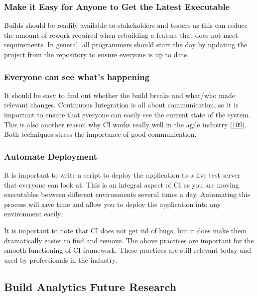 \documentclass[]{book}
\begin{document}
\subsubsection{Make it Easy for Anyone to Get the Latest
Executable}\label{make-it-easy-for-anyone-to-get-the-latest-executable}

Builds should be readily available to stakeholders and testers as this
can reduce the amount of rework required when rebuilding a feature that
does not meet requirements. In general, all programmers should start the
day by updating the project from the repository to ensure everyone is up
to date.

\subsubsection{Everyone can see what's
happening}\label{everyone-can-see-whats-happening}

It should be easy to find out whether the build breaks and what/who made
relevant changes. Continuous Integration is all about communication, so
it is important to ensure that everyone can easily see the current state
of the system. This is also another reason why CI works really well in
the agile industry
{[}\protect\hyperlink{ref-stolberg2009enabling}{109}{]}. Both techniques
stress the importance of good communication.

\subsubsection{Automate Deployment}\label{automate-deployment}

It is important to write a script to deploy the application to a live
test server that everyone can look at. This is an integral aspect of CI
as you are moving executables between different environments several
times a day. Automating this process will save time and allow you to
deploy the application into any environment easily.

It is important to note that CI does not get rid of bugs, but it does
make them dramatically easier to find and remove. The above practices
are important for the smooth functioning of CI framework. These
practices are still relevant today and used by professionals in the
industry.

\subsection{Build Analytics Future
Research}\label{build-analytics-future-research}
\end{document}
